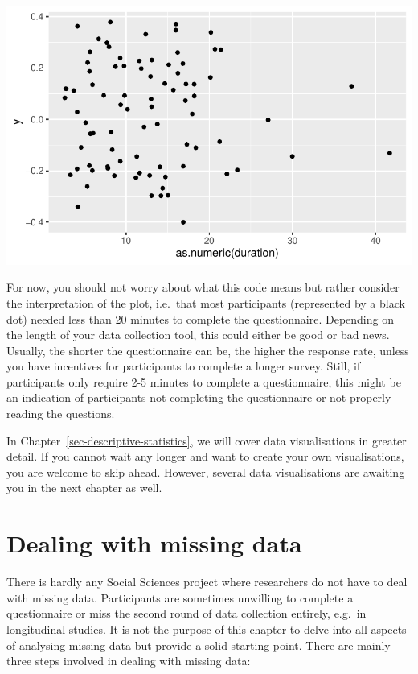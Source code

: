 \documentclass[
  letterpaper,
]{krantz}
\begin{document}
\includegraphics{07_data_wrangling_files/figure-pdf/duration-boxplot-1.pdf}

For now, you should not worry about what this code means but rather
consider the interpretation of the plot, i.e.~that most participants
(represented by a black dot) needed less than 20 minutes to complete the
questionnaire. Depending on the length of your data collection tool,
this could either be good or bad news. Usually, the shorter the
questionnaire can be, the higher the response rate, unless you have
incentives for participants to complete a longer survey. Still, if
participants only require 2-5 minutes to complete a questionnaire, this
might be an indication of participants not completing the questionnaire
or not properly reading the questions.

In Chapter~\ref{sec-descriptive-statistics}, we will cover data
visualisations in greater detail. If you cannot wait any longer and want
to create your own visualisations, you are welcome to skip ahead.
However, several data visualisations are awaiting you in the next
chapter as well.

\section{Dealing with missing data}\label{sec-dealing-with-missing-data}

There is hardly any Social Sciences project where researchers do not
have to deal with missing data. Participants are sometimes unwilling to
complete a questionnaire or miss the second round of data collection
entirely, e.g.~in longitudinal studies. It is not the purpose of this
chapter to delve into all aspects of analysing missing data but provide
a solid starting point. There are mainly three steps involved in dealing
with missing data:
\end{document}
